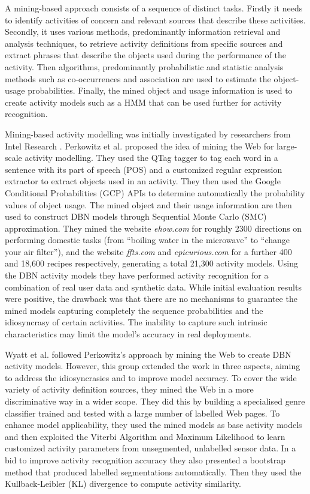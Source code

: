 A mining-based approach consists of a sequence of distinct tasks. Firstly it needs to identify activities of concern and relevant sources that describe these activities. Secondly, it uses various methods, predominantly information retrieval and analysis techniques, to retrieve activity definitions from specific sources and extract phrases that describe the objects used during the performance of the activity. Then algorithms, predominantly probabilistic and statistic analysis methods such as co-occurrences and association are used to estimate the object-usage probabilities. Finally, the mined object and usage information is used to create activity models such as a HMM that can be used further for activity recognition. 

Mining-based activity modelling was initially investigated by researchers from Intel Research \cite{Wu2007} \cite{Wyatt2005}. Perkowitz et al. \cite{Perkowitz2004} proposed the idea of mining the Web for large-scale activity modelling. They used the QTag tagger to tag each word in a sentence with its part of speech (POS) and a customized regular expression extractor to extract objects used in an activity. They then used the Google Conditional Probabilities (GCP) APIs to determine automatically the probability values of object usage. The mined object and their usage information are then used to construct DBN models through Sequential Monte Carlo (SMC) approximation. They mined the website \textit{ehow.com} for roughly 2300 directions on performing domestic tasks (from “boiling water in the microwave” to “change your air filter”), and the website \textit{ffts.com} and \textit{epicurious.com} for a further 400 and 18,600 recipes respectively, generating a total 21,300 activity models. Using the DBN activity models they have performed activity recognition for a combination of real user data and synthetic data. While initial evaluation results were positive, the drawback was that there are no mechanisms to guarantee the mined models capturing completely the sequence probabilities and the idiosyncrasy of certain activities. The inability to capture such intrinsic characteristics may limit the model's accuracy in real deployments.

Wyatt et al. \cite{Wyatt2005} followed Perkowitz’s approach by mining the Web to create DBN activity models. However, this group extended the work in three aspects, aiming to address the idiosyncrasies and to improve model accuracy. To cover the wide variety of activity definition sources, they mined the Web in a more discriminative way in a wider scope. They did this by building a specialised genre classifier trained and tested with a large number of labelled Web pages. To enhance model applicability, they used the mined models as base activity models and then exploited the Viterbi Algorithm and Maximum Likelihood to learn customized activity parameters from unsegmented, unlabelled sensor data. In a bid to improve activity recognition accuracy they also presented a bootstrap method that produced labelled segmentations automatically. Then they used the Kullback-Leibler (KL) divergence to compute activity similarity.

